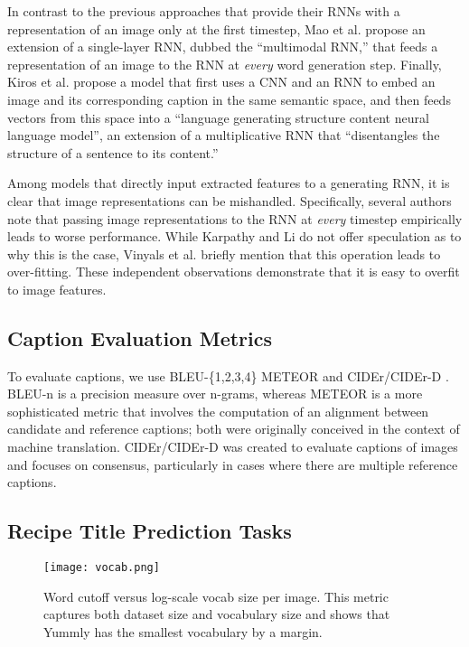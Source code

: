 \documentclass[11pt]{article}
\begin{document}
In contrast to the previous approaches that provide their RNNs with a
representation of an image only at the first timestep, Mao et
al.  propose an extension of a single-layer
RNN, dubbed the ``multimodal RNN,'' that feeds a representation of an
image to the RNN at \emph{every} word generation step. Finally, Kiros
et al.  propose a model that first uses a
CNN and an RNN to embed an image and its corresponding caption in the
same semantic space, and then feeds vectors from this space into a
``language generating structure content neural language model'', an
extension of a multiplicative RNN that ``disentangles the structure of
a sentence to its content.''

Among models that directly input extracted features to a generating
RNN, it is clear that image representations can be
mishandled. Specifically, several authors note that passing image
representations to the RNN at \emph{every} timestep empirically leads
to worse performance. While Karpathy and Li
 do not offer speculation as to why this
is the case, Vinyals et al.  briefly
mention that this operation leads to over-fitting. These independent
observations demonstrate that it is easy to overfit to image features.

\subsection{Caption Evaluation Metrics}

To evaluate captions, we use BLEU-\{1,2,3,4\} \cite{papineni2002bleu}
METEOR \cite{denkowski:lavie:meteor-wmt:2014} and CIDEr/CIDEr-D
\cite{vedantam2014cider}. BLEU-n is a precision measure over n-grams,
whereas METEOR is a more sophisticated metric that involves the
computation of an alignment between candidate and reference captions;
both were originally conceived in the context of machine
translation. CIDEr/CIDEr-D was created to evaluate captions of images
and focuses on consensus, particularly in cases where there are
multiple reference captions.

\subsection{Recipe Title Prediction Tasks}
\begin{figure}
  \centering \texttt{[image: vocab.png]}
  \caption{Word cutoff versus log-scale vocab size per
    image. This metric captures both dataset size and
    vocabulary size and shows that Yummly has the smallest 
    vocabulary by a margin.}
    \label{fig:vocabsize}
\end{figure}
\end{document}

